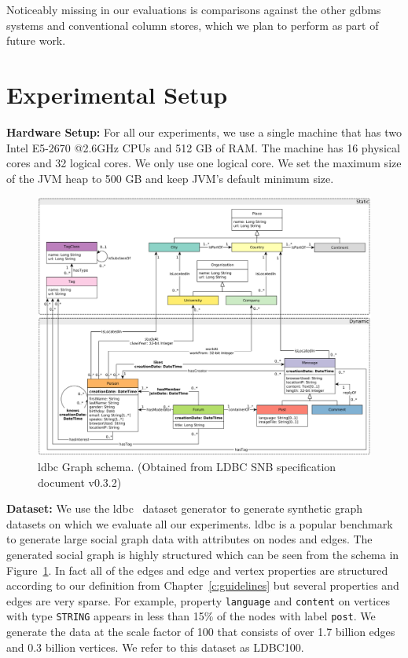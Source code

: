 Noticeably missing in our evaluations is comparisons against the other \gls{gdbms} systems and conventional column stores, which we plan to perform as part of future work.

\section{Experimental Setup}

\noindent \textbf{Hardware Setup:} For all our experiments, we use a single machine that has two Intel E5-2670 @2.6GHz CPUs and 512 GB of RAM. The machine has 16 physical cores and 32 logical cores. We only use one logical core. We set the maximum size of the JVM heap to 500 GB and keep JVM's default minimum size.

\begin{figure}
	\centering
	\includegraphics[scale=0.42]{img/ldbc-schema}
	\captionsetup{justification=centering}
	\caption{\gls{ldbc} Graph schema. (Obtained from LDBC SNB specification document v0.3.2)}
	\label{fig:ldbc-schema}
\end{figure}

\noindent \textbf{Dataset:} We use the \gls{ldbc}~\cite{ldbc} dataset generator to generate synthetic graph datasets on which we evaluate all our experiments. \gls{ldbc} is a popular benchmark to generate large social graph data with attributes on nodes and edges. The generated social graph is highly structured which can be seen from the schema in Figure~\ref{fig:ldbc-schema}. In fact all of the edges and edge and vertex properties are structured according to our definition from Chapter~\ref{c:guidelines} but several properties and edges are very sparse. For example, property \texttt{language} and \texttt{content} on vertices with type \texttt{STRING} appears in less than 15\% of the nodes with label \texttt{post}. We generate the data at the scale factor of 100 that consists of over 1.7 billion edges and 0.3 billion vertices. We refer to this dataset as LDBC100.

